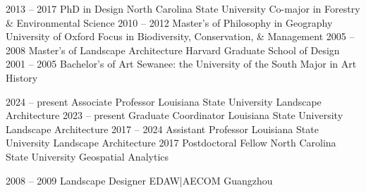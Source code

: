 \documentclass[10pt]{designcv}
\begin{document}
\vspace*{-0.2cm}

\begin{entrylist}
	\entry
		{2013 -- 2017}
		{PhD in Design}
		{North Carolina State University}
		{Co-major in Forestry \& Environmental Science}
	\entry
		{2010 -- 2012}
		{Master's of Philosophy in Geography} %
		{University of Oxford}
		{Focus in Biodiversity, Conservation, \& Management}
	\entry
		{2005 -- 2008}
		{Master's of Landscape Architecture}
		{Harvard Graduate School of Design}
		{\vspace*{-1em}}
	\entry
		{2001 -- 2005}
		{Bachelor's of Art}
		{Sewanee: the University of the South}
		{Major in Art History}
\end{entrylist}




\begin{entrylist}
	\entry
		{2024 -- present}
		{Associate Professor}
		{Louisiana State University}
		{Landscape Architecture}
	\entry
		{2023 -- present}
		{Graduate Coordinator}
		{Louisiana State University}
		{Landscape Architecture}
	\entry
		{2017 -- 2024}
		{Assistant Professor}
		{Louisiana State University}
		{Landscape Architecture}
	\entry
		{2017}
		{Postdoctoral Fellow}
		{North Carolina State University}
		{Geospatial Analytics}
\end{entrylist}


\begin{entrylist}
	\entry
		{2008 -- 2009}
		{Landscape Designer}
		{EDAW|AECOM Guangzhou}
		{}
\end{entrylist}

\clearpage


\nocite{*}
\setlength\bibitemsep{0.75em}

\printbibliography[title={\cvsect{Books}\vspace*{-2em}}, type=book, heading=subbibliography]

\printbibliography[title={\cvsect{Papers}\vspace*{-2em}}, keyword=peer_reviewed, heading=subbibliography]
\end{document}

